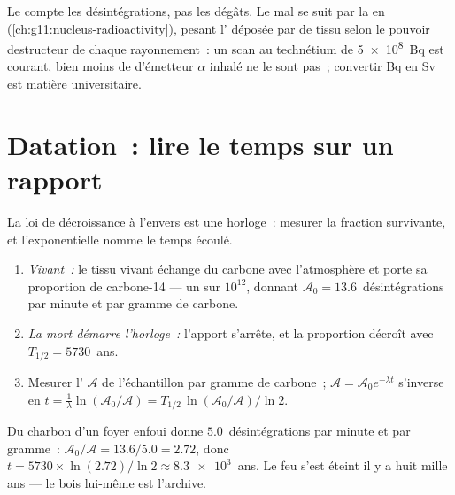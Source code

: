 \begin{remark}\label{rem:g12:radioactive-decay:dose}
Le  compte les désintégrations, pas
les dégâts. Le mal se suit par la  en
 (\cref{ch:g11:nucleus-radioactivity}),
pesant l' déposée par
 de tissu selon le pouvoir destructeur
de chaque rayonnement~: un scan au technétium de \qty{5e8}{Bq} est
courant, bien moins de  d'émetteur
$\alpha$ inhalé ne le sont pas~; convertir \unit{Bq} en \unit{Sv} est
matière universitaire.
\end{remark}

\section{Datation~: lire le temps sur un rapport}

La loi de décroissance à l'envers est une horloge~: mesurer la
fraction survivante, et l'exponentielle nomme le temps écoulé.

\begin{method}\label{met:g12:radioactive-decay:carbon}
\begin{enumerate}
  \item \emph{Vivant~:} le tissu vivant échange du carbone avec
        l'atmosphère et porte sa proportion de carbone-14 --- un
         sur $10^{12}$, donnant
        $\mathcal A_0 = 13.6$~désintégrations par minute et par gramme
        de carbone.
  \item \emph{La mort démarre l'horloge~:} l'apport s'arrête, et la
        proportion décroît avec $T_{1/2} = \num{5730}$~ans.
  \item Mesurer l' $\mathcal A$ de
        l'échantillon par gramme de carbone~;
        $\mathcal A = \mathcal A_0 e^{-\lambda t}$ s'inverse en
        $t = \frac{1}{\lambda}\ln(\mathcal A_0/\mathcal A)
        = T_{1/2}\,\ln(\mathcal A_0/\mathcal A)/\ln 2$.
\end{enumerate}
\end{method}

\begin{example}\label{ex:g12:radioactive-decay:hearth}
Du charbon d'un foyer enfoui donne $5.0$~désintégrations par minute
et par gramme~: $\mathcal A_0/\mathcal A = 13.6/5.0 = 2.72$, donc
$t = \num{5730} \times \ln(2.72)/\ln 2 \approx \num{8.3e3}$~ans. Le
feu s'est éteint il y a huit mille ans --- le bois lui-même est
l'archive.
\end{example}

